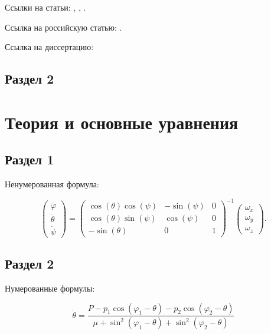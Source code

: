 \documentclass[a4paper,14pt]{extarticle}
\begin{document}
Ссылки на статьи: \cite{miller1}, \cite{miller2}, \cite{mohseni1}.

Ссылка на российскую статью: \cite{skubachevskii1}.

Ссылка на диссертацию:  \cite{pavlichenko1}

\subsection{Раздел 2}

\pagebreak
\section{Теория и основные уравнения}

\subsection{Раздел 1}

Ненумерованная формула:

\begin{equation}
    \begin{pmatrix} \dot{\varphi}\\ \dot{\theta} \\ \dot{\psi} \end{pmatrix}
    = \begin{pmatrix}
        \cos(\theta)\cos(\psi) & -\sin(\psi) & 0 \\
        \cos(\theta)\sin(\psi) & \cos(\psi)  & 0 \\
        -\sin(\theta)         & 0         &  1
    \end{pmatrix}^{-1}
    \begin{pmatrix} \omega_x\\ \omega_y \\ \omega_z \end{pmatrix}. \nonumber
\end{equation}


\subsection{Раздел 2}

Нумерованные формулы:

\begin{equation}
\label{eq:1}
    \dot{\theta}=\frac{P-p_{1}\cos\left(\varphi_{1}-\theta\right)-p_{2}\cos\left(\varphi_{2}-\theta\right)}{\mu+\sin^{2}\left(\varphi_{1}-\theta\right)+\sin^{2}\left(\varphi_{2}-\theta\right)}
\end{equation}
\end{document}
